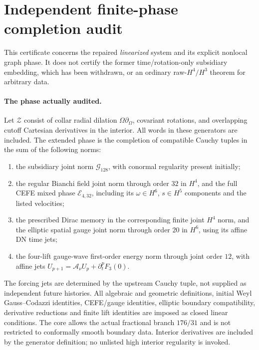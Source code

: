 \section{Independent finite-phase completion audit}
\label{sec:linear-completion-certificate}

This certificate concerns the repaired \emph{linearized} system and its
explicit nonlocal graph phase.  It does not certify the former
time/rotation-only subsidiary embedding, which has been withdrawn, or an
ordinary raw-$H^4/H^3$ theorem for arbitrary data.

\paragraph{The phase actually audited.}
Let $\mathcal Z$ consist of collar radial dilation
$\Omega\partial_\Omega$, covariant rotations, and overlapping cutoff
Cartesian derivatives in the interior.  All words in these generators are
included.  The extended phase is the completion of compatible Cauchy tuples
in the sum of the following norms:
\begin{enumerate}
\item the subsidiary joint norm $\mathcal G_{128}$, with conormal
regularity present initially;
\item the regular Bianchi field joint norm through order $32$ in $H^4$,
and the full CEFE mixed phase $\mathcal E_{4,32}$, including its
$\omega\in H^6$, $s\in H^5$ components and the listed velocities;
\item the prescribed Dirac memory in the corresponding finite joint
$H^4$ norm, and the elliptic spatial gauge joint norm through order $20$
in $H^6$, using its affine DN time jets;
\item the four-lift gauge-wave first-order energy norm through joint
order $12$, with affine jets
$U_{p+1}=\mathcal A_\nu U_p+\partial_t^pF_3(0)$.
\end{enumerate}
The forcing jets are determined by the upstream Cauchy tuple, not supplied
as independent future histories.  All algebraic and geometric definitions,
initial Weyl Gauss--Codazzi identities, CEFE/gauge identities, elliptic
boundary compatibility, derivative reductions and finite lift identities
are imposed as closed linear conditions.  The core allows the actual
fractional branch $176/31$ and is not restricted to conformally smooth
boundary data.  Interior derivatives are included by the generator
definition; no unlisted high interior regularity is invoked.

